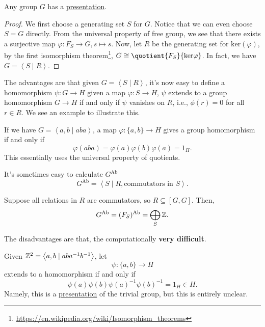 \begin{theorem}
	Any group \(G\) has a \hyperref[def:group-presentation]{presentation}.
\end{theorem}
\begin{proof}
	We first choose a generating set \(S\) for \(G\). Notice that we can even choose \(S = G\) directly. From the universal property of free group,
	we see that there exists a surjective map \(\varphi \colon F_S \to G, s \mapsto s\). Now, let \(R\) be the generating set for \(\mathrm{ker}(\varphi) \),
	by the first isomorphism theorem\footnote{\url{https://en.wikipedia.org/wiki/Isomorphism_theorems}}, \(G\cong \quotient{F_S}{\mathrm{ker} \varphi}\).
	In fact, we have \(G = \left< S \mid R \right> \).
\end{proof}

\hr
\begin{remark}
	The advantages are that given \(G = \left< S \mid R \right> \), it's now easy to define a homomorphism \(\psi \colon G\to H\) given a map
	\(\varphi \colon S\to H\), \(\psi \) extends to a group homomorphism \(G\to H\) if and only if \(\psi \) vanishes on \(R\), i.e., \(\phi (r) = 0\)
	for all \(r\in R\). We see an example to illustrate this.

	\begin{eg}
		If we have \(G = \left< a, b \mid aba \right> \), a map \(\varphi \colon \{a, b\}\to H\) gives a group homomorphism if and only if
		\[
			\varphi (aba) = \varphi (a)\varphi (b)\varphi (a) = 1_H.
		\]
		This essentially uses the universal property of quotients.
	\end{eg}
\end{remark}

\hr

\begin{remark}
	It's sometimes easy to calculate \(G^{\mathrm{Ab}}\)
	\[
		G^{\mathrm{Ab}} = \left< S \mid R, \text{commutators in \(S\)}\right>.
	\]
	\begin{eg}
		Suppose all relations in \(R\) are commutators, so \(R\subseteq[G, G]\). Then,
		\[
			G^{\mathrm{Ab}} = (F_S)^{\mathrm{Ab}} = \bigoplus_S \mathbb{\MakeUppercase{z}}.
		\]
	\end{eg}
\end{remark}
\begin{remark}
	The disadvantages are that, the computationally \textbf{very difficult}.
\end{remark}
\hr

\begin{eg}
	Given \(\mathbb{\MakeUppercase{z}} ^2 = \left< a, b \mid aba^{-1} b^{-1}  \right> \), let
	\[
		\psi \colon \{a, b\}\to H
	\]
	extends to a homomorphism if and only if
	\[
		\psi (a)\psi (b)\psi (a)^{-1} \psi (b)^{-1} = 1_H\in H.
	\]
	Namely, this is a \hyperref[def:group-presentation]{presentation} of the trivial group, but this is entirely unclear.
\end{eg}